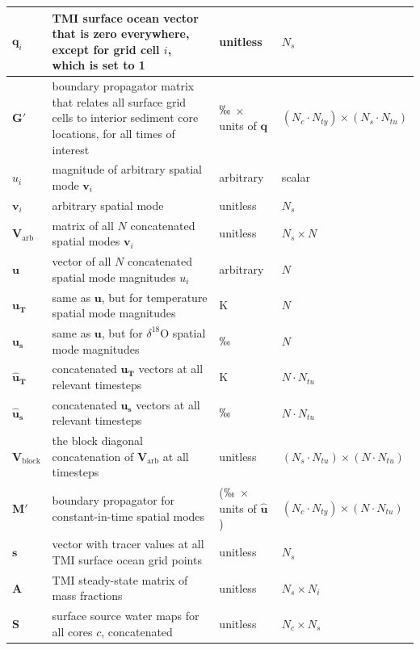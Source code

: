 \documentclass[draft]{agujournal2019}
\begin{document}
\begin{longtable}{| p{0.75in}|p{3.5in}|p{1in}|p{1in} |}
  \hline
  $\mathbf{q}_i$ & TMI surface ocean vector that is zero everywhere, except for grid cell $i$, which is set to 1 & unitless & $N_{s}$ \\
  \hline   
  $\mathbf{G}'$ & boundary propagator matrix that relates all surface grid cells to interior sediment core locations, for all times of interest & $\permil$ $\times$ units of $\mathbf{q}$ & $(N_{c} \cdot N_{ty}) \times (N_{s} \cdot N_{tu})$ \\
  \hline
  $u_i$ & magnitude of arbitrary spatial mode $\mathbf{v}_{i}$ & arbitrary & scalar \\
  \hline
  $\mathbf{v}_{i}$ & arbitrary spatial mode & unitless & $N_{s}$ \\
  \hline 
  $\mathbf{V}_{\mathrm{arb}}$ & matrix of all $N$ concatenated spatial modes $\mathbf{v}_{i}$ & unitless & $N_{s} \times N$ \\
  \hline
  $\mathbf{u}$ & vector of all $N$ concatenated spatial mode magnitudes $u_{i}$ & arbitrary & $N$ \\
  \hline
  $\mathbf{u_{T}}$ & same as $\mathbf{u}$, but for temperature spatial mode magnitudes & K & $N$ \\
  \hline
  $\mathbf{u_{s}}$ & same as $\mathbf{u}$, but for $\delta^{18}\mathrm{O}$ spatial mode magnitudes & $\permil$ & $N$ \\
  \hline
  $\mathbf{\hat{u}_{T}}$ & concatenated $\mathbf{u_{T}}$ vectors at all relevant timesteps & K & $N \cdot N_{tu}$ \\
  \hline
    $\mathbf{\hat{u}_{s}}$ & concatenated $\mathbf{u_{s}}$ vectors at all relevant timesteps & $\permil$ & $N \cdot N_{tu}$ \\
  \hline
  $\mathbf{V}_{\mathrm{block}}$ & the block diagonal concatenation of $\mathbf{V}_{\mathrm{arb}}$ at all timesteps & unitless & $(N_{s} \cdot N_{tu}) \times (N \cdot N_{tu})$\\
  \hline
  $\mathbf{M}'$ & boundary propagator for constant-in-time spatial modes & ($\permil$ $\times$ units of $\mathbf{\hat{u}}$) & $(N_{c} \cdot N_{ty}) \times (N \cdot N_{tu})$ \\
  \hline
  $\mathbf{s}$ & vector with tracer values at all TMI surface ocean grid points & unitless & $N_{s}$ \\
  \hline
  $\mathbf{A}$ & TMI steady-state matrix of mass fractions \cite{gebbie2010} & unitless & $N_{s} \times N_{i}$ \\
  \hline
  $\mathbf{S}$ & surface source water maps for all cores $c$, concatenated & unitless & $N_{c} \times N_{s}$ \\

\end{longtable}
\end{document}
